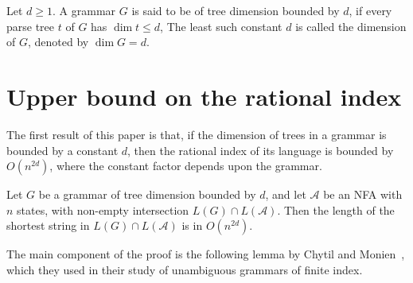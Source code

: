 \documentclass[runningheads]{llncs}
\newcommand{\ifdraft}[1]{#1}
\newcommand{\ao}[1]{\ifdraft{\noindent\colorbox{aocolour}{A.O.: #1}}}
\begin{document}

\begin{definition}
Let $d \geqslant 1$.
A grammar $G$ is said to be of tree dimension bounded by $d$,
if every parse tree $t$ of $G$ has $\dim t \leqslant d$,
The least such constant $d$ is called the dimension of $G$,
denoted by $\dim G=d$.
\end{definition}







\section{Upper bound on the rational index}\label{section_upper_bound} %

The first result of this paper
is that, if the dimension of trees in a grammar is bounded by a constant $d$,
then the rational index of its language is bounded by $O(n^{2d})$,
where the constant factor depends upon the grammar.

\begin{theorem}\label{rational_index_upper_bound_theorem}
Let $G$ be a grammar of tree dimension bounded by $d$,
and let $\mathcal{A}$ be an NFA with $n$ states,
with non-empty intersection $L(G) \cap L(\mathcal{A})$.
Then the length of the shortest string in $L(G) \cap L(\mathcal{A})$ is in $O(n^{2d})$.
\end{theorem}

The main component of the proof
is the following lemma by Chytil and Monien~\cite{ChytilMonien},
which they used in their study of unambiguous grammars of finite index.
\end{document}
